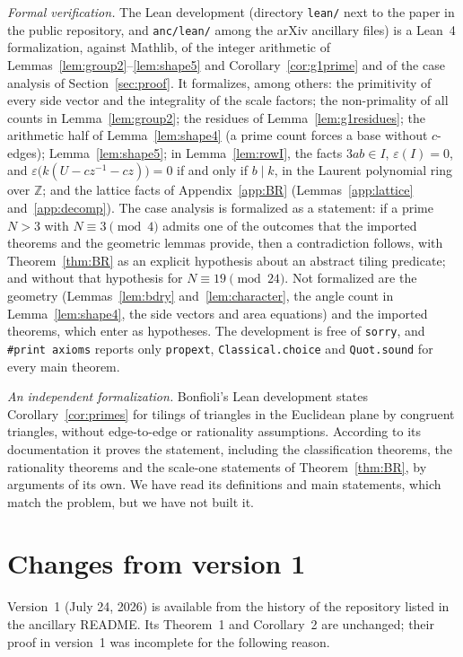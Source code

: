 \documentclass[11pt]{amsart}
\theoremstyle{remark}
\newcommand{\Z}{\mathbb{Z}}
\begin{document}
\emph{Formal verification.} The Lean development (directory \texttt{lean/} next to the paper in the public repository, and \texttt{anc/lean/} among the arXiv ancillary files) is a Lean~4 formalization, against Mathlib, of the integer arithmetic of Lemmas~\ref{lem:group2}--\ref{lem:shape5} and Corollary~\ref{cor:g1prime} and of the case analysis of Section~\ref{sec:proof}. It formalizes, among others: the primitivity of every side vector and the integrality of the scale factors; the non-primality of all counts in Lemma~\ref{lem:group2}; the residues of Lemma~\ref{lem:g1residues}; the arithmetic half of Lemma~\ref{lem:shape4} (a prime count forces a base without $c$-edges); Lemma~\ref{lem:shape5}; in Lemma~\ref{lem:rowI}, the facts $3ab\in I$, $\varepsilon(I)=0$, and $\varepsilon\bigl(k(U-cz^{-1}-cz)\bigr)=0$ if and only if $b\mid k$, in the Laurent polynomial ring over $\Z$; and the lattice facts of Appendix~\ref{app:BR} (Lemmas~\ref{app:lattice} and~\ref{app:decomp}). The case analysis is formalized as a statement: if a prime $N>3$ with $N\equiv3\pmod4$ admits one of the outcomes that the imported theorems and the geometric lemmas provide, then a contradiction follows, with Theorem~\ref{thm:BR} as an explicit hypothesis about an abstract tiling predicate; and without that hypothesis for $N\equiv19\pmod{24}$. Not formalized are the geometry (Lemmas~\ref{lem:bdry} and~\ref{lem:character}, the angle count in Lemma~\ref{lem:shape4}, the side vectors and area equations) and the imported theorems, which enter as hypotheses. The development is free of \texttt{sorry}, and \texttt{\#print axioms} reports only \texttt{propext}, \texttt{Classical.choice} and \texttt{Quot.sound} for every main theorem.

\emph{An independent formalization.} Bonfioli's Lean development \cite{Bonfioli2} states Corollary~\ref{cor:primes} for tilings of triangles in the Euclidean plane by congruent triangles, without edge-to-edge or rationality assumptions. According to its documentation it proves the statement, including the classification theorems, the rationality theorems and the scale-one statements of Theorem~\ref{thm:BR}, by arguments of its own. We have read its definitions and main statements, which match the problem, but we have not built it.

\section{Changes from version 1}\label{sec:changes}

Version~1 (July 24, 2026) is available from the history of the repository listed in the ancillary README. Its Theorem~1 and Corollary~2 are unchanged; their proof in version~1 was incomplete for the following reason.
\end{document}

